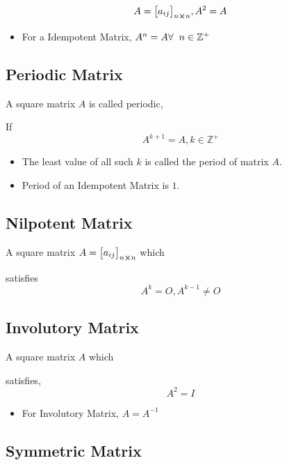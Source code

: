 \documentclass{article}
\begin{document}
$$A={\begin{bmatrix}
        a_{ij}
    \end{bmatrix}}_{n \cross n}, A^2=A $$

\begin{itemize}

    \item   For a Idempotent Matrix, $A^n=A \hfill \forall \hspace{2mm} n \in \mathbb{Z^+}$
\end{itemize}
\subsection{Periodic Matrix}

A square matrix $A$ is called periodic,

If $$A^{k+1}=A, k \in \mathbb{Z^+} $$
\begin{itemize}

    \item  The least value of all such $k$ is called the period of matrix $A$.

    \item   Period of an Idempotent Matrix is $1$.
\end{itemize}
\subsection{Nilpotent Matrix}

A square matrix $A={\begin{bmatrix}
        a_{ij}
    \end{bmatrix}}_{n \cross n} $ which

satisfies $$A^k=O, A^{k-1} \not=O $$

\subsection{Involutory Matrix}

A square matrix $A$ which

satisfies, $$A^2=I$$
\begin{itemize}

    \item   For Involutory Matrix, $A=A^{-1}$
\end{itemize}
\subsection{Symmetric Matrix}
\end{document}
